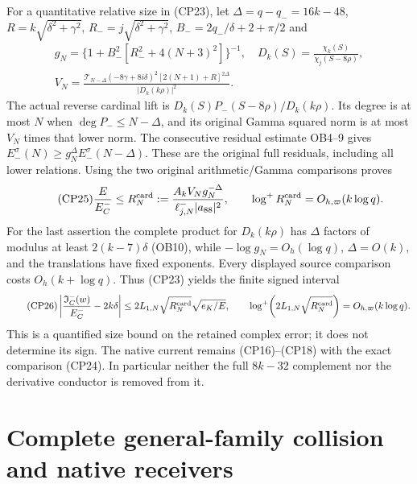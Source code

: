 \documentclass[11pt]{article}
\begin{document}
For a quantitative relative size in (CP23), let
$\Delta=q-q_-=16k-48$, $R=k\sqrt{\delta^2+\gamma^2}$,
$R_-=j\sqrt{\delta^2+\gamma^2}$,
$B_-=2q_-/\delta+2+\pi/2$ and
\[
 \begin{gathered}
 g_N=\{1+B_-^2[R_-^2+4(N+3)^2]\}^{-1},\quad
 D_k(S)=\frac{\chi_k(S)}{\chi_j(S-8\rho)},\\
 V_N=\frac{\mathcal T_{N-\Delta}(-8\gamma+8i\delta)^2
                   [2(N+1)+R]^{2\Delta}}{|D_k(k\rho)|^2}.
 \end{gathered}
\]
The actual reverse cardinal lift is
$D_k(S)P_-(S-8\rho)/D_k(k\rho)$. Its degree is at most $N$ when
$\deg P_-\le N-\Delta$, and its original Gamma squared norm is at
most $V_N$ times that lower norm. The consecutive residual estimate
OB4--9 gives
$E_-^\sigma(N)\ge g_N^\Delta E_-^\sigma(N-\Delta)$.
These are the original full residuals, including all lower relations.
Using the two original arithmetic/Gamma comparisons proves
\begin{equation}\tag{CP25}
 \frac{E}{E_C^-}\le
 R_N^{\rm card}:=\frac{A_k V_N g_N^{-\Delta}}
                       {\ell_{j,N}^-|a_{88}|^2},\qquad
 \log^+R_N^{\rm card}=O_{h,\varpi}(k\log q).
\end{equation}
For the last assertion the complete product for $D_k(k\rho)$ has
$\Delta$ factors of modulus at least $2(k-7)\delta$ (OB10), while
$-\log g_N=O_h(\log q)$, $\Delta=O(k)$, and the translations have
fixed exponents. Every displayed source comparison costs $O_h(k+\log q)$.
Thus (CP23) yields the finite signed interval
\begin{equation}\tag{CP26}
 \left|\frac{\mathfrak I_C^-(w)}{E_C^-}-2k\delta\right|
 \le2L_{1,N}\sqrt{R_N^{\rm card}}\sqrt{e_K/E},\qquad
 \log^+\!\left(2L_{1,N}\sqrt{R_N^{\rm card}}\right)
                         =O_{h,\varpi}(k\log q).
\end{equation}
This is a quantified size bound on the retained complex error; it
does not determine its sign. The native current remains (CP16)--(CP18)
with the exact comparison (CP24). In particular neither the full
$8k-32$ complement nor the derivative conductor is removed from it.



\clearpage
\section*{Complete general-family collision and native receivers}
\end{document}
